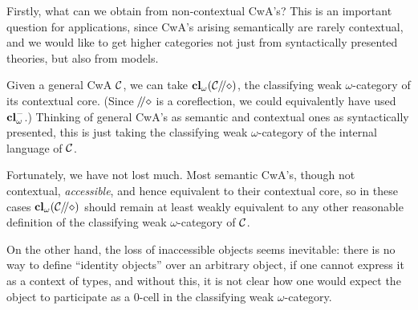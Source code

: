 \begin{para}Firstly, what can we obtain from non-contextual CwA's?  This is an important question for applications, since CwA's arising semantically are rarely contextual, and we would like to get higher categories not just from syntactically presented theories, but also from models.

Given a general CwA $\mathcal{C}$, we can take $\mathbf{cl}_\omega(\mathcal{C} \!\!\; / \!\!\!\; / \diamond)$, the classifying weak $\omega$-category of its contextual core.  (Since $\!\!\; / \!\!\!\; / \diamond$ is a coreflection, we could equivalently have used $\mathbf{cl}_\omega^-$.)  Thinking of general CwA's as semantic and contextual ones as syntactically presented, this is just taking the classifying weak $\omega$-category of the internal language of $\mathcal{C}$.

Fortunately, we have not lost much.  Most semantic CwA's, though not contextual, \emph{accessible}, and hence equivalent to their contextual core, so in these cases $\mathbf{cl}_\omega(\mathcal{C} \!\!\; / \!\!\!\; / \diamond)$ should remain at least weakly equivalent to any other reasonable definition of the classifying weak $\omega$-category of $\mathcal{C}$.

On the other hand, the loss of inaccessible objects seems inevitable: there is no way to define ``identity objects'' over an arbitrary object, if one cannot express it as a context of types, and without this, it is not clear how one would expect the object to participate as a 0-cell in the classifying weak $\omega$-category.
\end{para}


